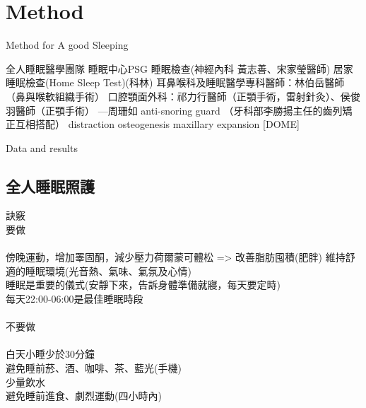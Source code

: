 \documentclass[aspectratio=169]{beamer}
\begin{document}
\section{Method}
\begin{frame}{Method for A good Sleeping}
\begin{block}{全人睡眠醫學團隊}
睡眠中心PSG 睡眠檢查(神經內科 黃志善、宋家瑩醫師)
居家睡眠檢查(Home Sleep Test)(科林)
耳鼻喉科及睡眠醫學專科醫師：林伯岳醫師（鼻與喉軟組織手術）
口腔顎面外科：祁力行醫師（正顎手術，雷射針灸）、侯俊羽醫師（正顎手術）
—周珊如 anti-snoring guard
（牙科部李勝揚主任的齒列矯正互相搭配）
distraction osteogenesis maxillary expansion [DOME]
~~\\
\end{block}
\end{frame}


\begin{frame}{Data and results}
\subsection{全人睡眠照護}
\begin{block}{訣竅}
~~\\
要做\\
~~\\
傍晚運動，增加睪固酮，減少壓力荷爾蒙可體松 => 改善脂肪囤積(肥胖)
維持舒適的睡眠環境(光音熱、氣味、氣氛及心情)\\
睡眠是重要的儀式(安靜下來，告訴身體準備就寢，每天要定時)\\
每天22:00-06:00是最佳睡眠時段\\

~~\\
不要做\\
~~\\
白天小睡少於30分鐘\\
避免睡前菸、酒、咖啡、茶、藍光(手機)\\
少量飲水\\
避免睡前進食、劇烈運動(四小時內)\\
~~\\
~~\\
\end{block}
\end{frame}
\end{document}
